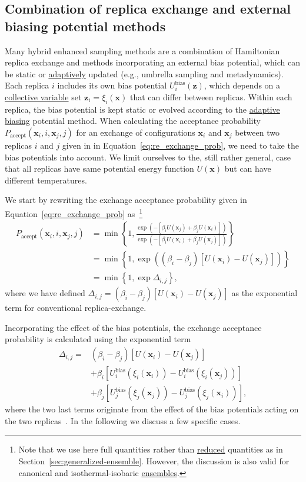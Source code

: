 \documentclass[9pt,review]{livecoms}
\newcommand{\vx}{\mathbf{x}}
\newcommand{\vz}{\mathbf{z}}
\begin{document}
\subsection{Combination of replica exchange and external biasing potential methods}

Many hybrid enhanced sampling methods are a combination of Hamiltonian replica exchange and methods incorporating an external bias potential, which can be static or \hyperlink{ref:Adaptive} {adaptively} updated (e.g., umbrella sampling and metadynamics). Each replica $i$ includes its own bias potential $U^{\mathrm{bias}}_{i}(\vz)$, which depends on a \hyperlink{ref:CV} {collective variable} set $\vz_{i} = \xi_{i}(\vx)$ that can differ between replicas. Within each replica, the bias potential is kept static or evolved according to the \hyperlink{ref:Adaptive} {adaptive} \hyperlink{ref:biasingE} {biasing} potential method. When calculating the acceptance probability $P_\mathrm{accept}(\vx_i, i, \vx_j, j)$ for an exchange of configurations $\vx_{i}$ and $\vx_{j}$ between two replicas $i$ and $j$ given in in Equation~\ref{eq:re_exchange_prob}, we need to take the bias potentials into account. We limit ourselves to the, still rather general, case that all replicas have same potential energy function $U(\vx)$ but can have different temperatures.

We start by rewriting the exchange acceptance probability given in Equation~\ref{eq:re_exchange_prob}
as~\footnote{Note that we use here full quantities rather than \hyperlink{ref:reduced} {reduced} quantities as in Section~\ref{sec:generalized-ensemble}. However, the discussion is also valid for canonical and isothermal-isobaric \hyperlink{ref:Ensemble} {ensembles}.}
\begin{align}
\label{eq:replexc_acceptance probability}
P_\mathrm{accept}(\vx_i, i, \vx_j, j) &=
\min\left\{1,\frac{\exp(-[\beta_{i}U(\vx_j)+\beta_{j}U(\vx_i)])}{\exp(-[\beta_{i}U(\vx_i)+\beta_{j}U(\vx_j)])}\right\}
\nonumber \\
&=
\min\left\{1,\exp\left(\left(\beta_{i} - \beta_{j}\right)
\left[U(\vx_{i}) - U(\vx_{j})\right]\right)\right\}
\nonumber \\
&=
\min\left\{1,\exp \Delta_{i,j}\right\},
\end{align}
where we have defined $\Delta_{i,j}=\left(\beta_{i} - \beta_{j}\right)
\left[U(\vx_{i}) - U(\vx_{j})\right]
$ as the exponential term for conventional replica-exchange.

Incorporating the effect of the bias potentials, the exchange acceptance probability is calculated using the exponential term
\begin{align}
\Delta_{i,j} = &
\left(\beta_{i} - \beta_{j}\right)
\left[U(\vx_{i}) - U(\vx_{j})\right]
\nonumber \\ & +
\beta_{i} \left[
U^{\mathrm{bias}}_{i}(\xi_{i}(\vx_{i})) - U^{\mathrm{bias}}_{i}(\xi_{i}(\vx_{j}))
\right]
\nonumber \\ & +
\beta_{j} \left[
U^{\mathrm{bias}}_{j}(\xi_{j}(\vx_{j})) - U^{\mathrm{bias}}_{j}(\xi_{j}(\vx_{i}))
\right],
\end{align}
where the two last terms originate from the effect of the bias potentials acting on the two replicas~\cite{Bussi-JACS-2006}. In the following we discuss a few specific cases.
\end{document}
